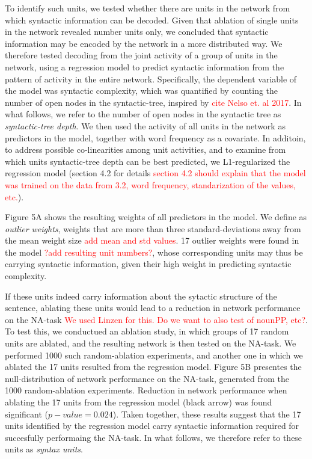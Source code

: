 To identify such units, we tested whether there are units in the network from which syntactic information can be decoded. Given that ablation of single units in the network revealed number units only, we concluded that syntactic information may be encoded by the network in a more distributed way. We therefore tested decoding from the joint activity of a group of units in the network, using a regression model to predict syntactic information from the pattern of activity in the entire network. Specifically, the dependent variable of the model was syntactic complexity, which was quantified by counting the number of open nodes in the syntactic-tree, inspired by \textcolor{red}{cite Nelso et. al 2017}. In what follows, we refer to the number of open nodes in the syntactic tree as \textit{syntactic-tree depth}. We then used the activity of all units in the network as predictors in the model, together with word frequency as a covariate. In additoin, to address possible co-linearities among unit activities, and to examine from which units syntactic-tree depth can be best predicted, we L1-regularized the regression model (section 4.2 for details \textcolor{red}{section 4.2 should explain that the model was trained on the data from 3.2, word frequency, standarization of the values, etc.}). 

Figure 5A shows the resulting weights of all predictors in the model. We define as \textit{outlier weights}, weights that are more than three standard-deviations away from the mean weight size \textcolor{red}{add mean and std values}. 17 outlier weights were found in the model \textcolor{red}{?add resulting unit numbers?}, whose corresponding units may thus be carrying syntactic information, given their high weight in predicting syntactic complexity. 

If these units indeed carry information about the sytactic structure of the sentence, ablating these units would lead to a reduction in network performance on the NA-task \textcolor{red}{We used Linzen for this. Do we want to also test of nounPP, etc?}. To test this, we conductued an ablation study, in which groups of 17 random units are ablated, and the resulting network is then tested on the NA-task. We performed 1000 such random-ablation experiments, and another one in which we ablated the 17 units resulted from the regression model. Figure 5B presentes the null-distribution of network performance on the NA-task, generated from the 1000 random-ablation experiments. Reduction in network performance when ablating the 17 units from the regression model (black arrow) was found significant ($p-value=0.024$). Taken together, these results suggest that the 17 units identified by the regression model carry syntactic information required for succesfully performaing the NA-task. In what follows, we therefore refer to these units as \textit{syntax units}.

